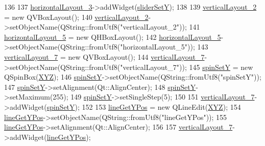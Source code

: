 \begin{DoxyCode}
136 
137         \hyperlink{class_ui___e3_p_j_r_af1b2167ad3027fe2c2328701164e54ec}{horizontalLayout\_3}->addWidget(\hyperlink{class_ui___e3_p_j_r_afc14eb4b41f896c3881b1f3f86ebb5ab}{sliderSetY});
138 
139         \hyperlink{class_ui___e3_p_j_r_a1f81b7e95162efcbe551b64ca41869c8}{verticalLayout\_2} = \textcolor{keyword}{new} QVBoxLayout();
140         \hyperlink{class_ui___e3_p_j_r_a1f81b7e95162efcbe551b64ca41869c8}{verticalLayout\_2}->setObjectName(QString::fromUtf8(\textcolor{stringliteral}{"verticalLayout\_2"}));
141         \hyperlink{class_ui___e3_p_j_r_a9200504b29bbbfa17f9e6aefafc2c122}{horizontalLayout\_5} = \textcolor{keyword}{new} QHBoxLayout();
142         \hyperlink{class_ui___e3_p_j_r_a9200504b29bbbfa17f9e6aefafc2c122}{horizontalLayout\_5}->setObjectName(QString::fromUtf8(\textcolor{stringliteral}{"horizontalLayout\_5"}));
143         \hyperlink{class_ui___e3_p_j_r_a6846ec6f18ab0ea13bdb2d00b2cb3947}{verticalLayout\_7} = \textcolor{keyword}{new} QVBoxLayout();
144         \hyperlink{class_ui___e3_p_j_r_a6846ec6f18ab0ea13bdb2d00b2cb3947}{verticalLayout\_7}->setObjectName(QString::fromUtf8(\textcolor{stringliteral}{"verticalLayout\_7"}));
145         \hyperlink{class_ui___e3_p_j_r_a855f6972ba1dc6a61308080e1dea2447}{spinSetY} = \textcolor{keyword}{new} QSpinBox(\hyperlink{class_ui___e3_p_j_r_a098a80b873d9e0a09fd834f09e5028b4}{XYZ});
146         \hyperlink{class_ui___e3_p_j_r_a855f6972ba1dc6a61308080e1dea2447}{spinSetY}->setObjectName(QString::fromUtf8(\textcolor{stringliteral}{"spinSetY"}));
147         \hyperlink{class_ui___e3_p_j_r_a855f6972ba1dc6a61308080e1dea2447}{spinSetY}->setAlignment(Qt::AlignCenter);
148         \hyperlink{class_ui___e3_p_j_r_a855f6972ba1dc6a61308080e1dea2447}{spinSetY}->setMaximum(255);
149         \hyperlink{class_ui___e3_p_j_r_a855f6972ba1dc6a61308080e1dea2447}{spinSetY}->setSingleStep(5);
150 
151         \hyperlink{class_ui___e3_p_j_r_a6846ec6f18ab0ea13bdb2d00b2cb3947}{verticalLayout\_7}->addWidget(\hyperlink{class_ui___e3_p_j_r_a855f6972ba1dc6a61308080e1dea2447}{spinSetY});
152 
153         \hyperlink{class_ui___e3_p_j_r_af7a504d650e35e560d66d6e9cc2ec20e}{lineGetYPos} = \textcolor{keyword}{new} QLineEdit(\hyperlink{class_ui___e3_p_j_r_a098a80b873d9e0a09fd834f09e5028b4}{XYZ});
154         \hyperlink{class_ui___e3_p_j_r_af7a504d650e35e560d66d6e9cc2ec20e}{lineGetYPos}->setObjectName(QString::fromUtf8(\textcolor{stringliteral}{"lineGetYPos"}));
155         \hyperlink{class_ui___e3_p_j_r_af7a504d650e35e560d66d6e9cc2ec20e}{lineGetYPos}->setAlignment(Qt::AlignCenter);
156 
157         \hyperlink{class_ui___e3_p_j_r_a6846ec6f18ab0ea13bdb2d00b2cb3947}{verticalLayout\_7}->addWidget(\hyperlink{class_ui___e3_p_j_r_af7a504d650e35e560d66d6e9cc2ec20e}{lineGetYPos});

\end{DoxyCode}
